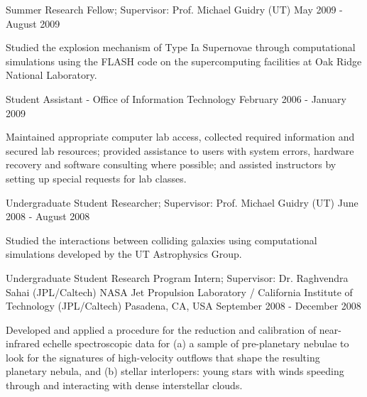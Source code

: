 \begin{cventries}
\cventry
    {Summer Research Fellow; Supervisor: Prof. Michael Guidry (UT)}
    {}
    {}
    {May 2009 - August 2009}
    {
      \begin{cvitems}
        \item {Studied the explosion mechanism of Type Ia Supernovae through computational simulations using the FLASH code on the supercomputing facilities at Oak Ridge National Laboratory.}
      \end{cvitems}
    }\vspace{-15pt}

\cventry
    {Student Assistant - Office of Information Technology}
    {}
    {}
    {February 2006 - January 2009}
    {
      \begin{cvitems}
        \item {Maintained appropriate computer lab access, collected required information and secured lab resources; provided assistance to users with system errors, hardware recovery and software consulting where possible; and assisted instructors by setting up special requests for lab classes.}
      \end{cvitems}
    }\vspace{-15pt}

\cventry
    {Undergraduate Student Researcher; Supervisor: Prof. Michael Guidry (UT)}
    {}
    {}
    {June 2008 - August 2008}
    {
      \begin{cvitems}
        \item {Studied the interactions between colliding galaxies using computational simulations developed by the UT Astrophysics Group.}
      \end{cvitems}
    }\vspace{-6pt}

\cventry
    {Undergraduate Student Research Program Intern; Supervisor: Dr. Raghvendra Sahai (JPL/Caltech)}
    {NASA Jet Propulsion Laboratory / California Institute of Technology (JPL/Caltech)}
    {Pasadena, CA, USA}
    {September 2008 - December 2008}
    {
      \begin{cvitems}
        \item {Developed and applied a procedure for the reduction and calibration of near-infrared echelle spectroscopic data for (a)  a sample of pre-planetary nebulae to look for the signatures of high-velocity outflows that shape the resulting planetary nebula, and (b) stellar interlopers: young stars with winds speeding through and interacting with dense interstellar clouds.}
      \end{cvitems}
    }
\end{cventries}
